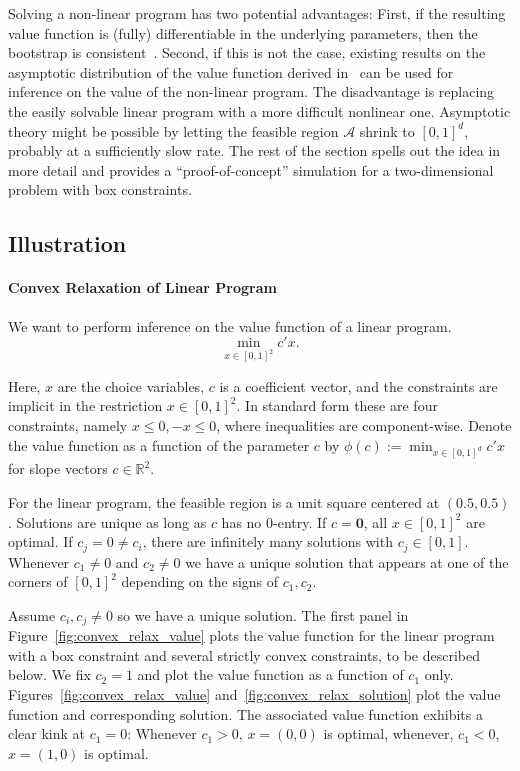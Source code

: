 \documentclass[12pt,a4paper,english]{article} %
\numberwithin{equation}{section}
\theoremstyle{definition}
\theoremstyle{remark}
\theoremstyle{plain}
\begin{document}
Solving a non-linear program has two potential advantages:
First, if the resulting value function is (fully) differentiable in the underlying parameters, then the bootstrap is consistent~\citep{fang2019infdirdiff}.
Second, if this is not the case, existing results on the asymptotic distribution of the value function derived in~\cite{shapiro1991asymptotic} can be used for inference on the value of the non-linear program.
The disadvantage is replacing the easily solvable linear program with a more difficult nonlinear one.
Asymptotic theory might be possible by letting the feasible region $\mathcal{A}$ shrink to $[0,1]^d$, probably at a sufficiently slow rate.
The rest of the section spells out the idea in more detail and provides a ``proof-of-concept'' simulation for a two-dimensional problem with box constraints.

\subsection{Illustration}

\paragraph{Convex Relaxation of Linear Program}
We want to perform inference on the value function of a linear program.
\begin{equation}
	\min_{x\in [0,1]^2} c'x.
\end{equation}

Here, $x$ are the choice variables, $c$ is a coefficient vector, and the constraints are implicit in the restriction $x \in [0,1]^2$.
In standard form these are four constraints, namely $x \leq 0, -x \leq 0$, where inequalities are component-wise.
Denote the value function as a function of the parameter $c$ by $\phi(c) := \min_{x\in[0,1]^d} c'x$ for slope vectors $c\in \mathbb{R}^2$.

For the linear program, the feasible region is a unit square centered at $(0.5, 0.5)$. Solutions are unique as long as $c$ has no $0$-entry.
If $c=\mathbf{0}$, all $x\in [0,1]^2$ are optimal. If $c_j = 0 \neq c_i$, there are infinitely many solutions with $c_j \in [0,1]$.
Whenever $c_1\neq0$ and $c_2\neq0$ we have a unique solution that appears at one of the corners of $[0,1]^2$ depending on the signs of $c_1, c_2$.

Assume $c_i, c_j \neq 0$ so we have a unique solution.
The first panel in Figure~\ref{fig:convex_relax_value} plots the value function for the linear program with a box constraint and several strictly convex constraints, to be described below.
We fix $c_2 = 1$ and plot the value function as a function of $c_1$ only.
Figures~\ref{fig:convex_relax_value} and~\ref{fig:convex_relax_solution} plot the value function and corresponding solution.
The associated value function exhibits a clear kink at $c_1 = 0$: Whenever $c_1 > 0$, $x = (0, 0)$ is optimal, whenever, $c_1 < 0$, $x=(1,0)$ is optimal.
\end{document}

